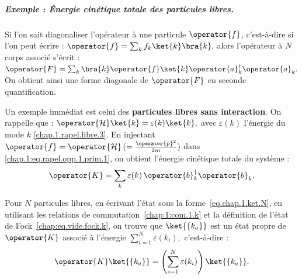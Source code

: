 \begin{mdframed}[
	linewidth=0.5pt, 
	backgroundcolor=gray!5, 
	roundcorner=50pt,	
	innerleftmargin=5pt,
    innerrightmargin=5pt,
    innertopmargin=-10pt,
    innerbottommargin=2pt,
    leftmargin=2pt,
    rightmargin=2pt
	]
\subparagraph{Exemple : Énergie cinétique totale des particules libres.}

Si l’on sait diagonaliser l’opérateur à une particule \( \operator{f} \), c’est-à-dire si l’on peut écrire :
\(
	\operator{f} = \sum_k f_k \ket{k} \bra{k},
\)
alors l’opérateur à $N$ corps associé s’écrit :
\(
	\operator{F} = \sum_k \bra{k} \operator{f} \ket{k} \operator{a}^\dagger_k \operator{a}_k^{}.
\)
On obtient ainsi une forme diagonale de \( \operator{F} \) en seconde quantification.

Un exemple immédiat est celui des \textbf{particules libres sans interaction}. On rappelle que :
\(
	\operator{\mathcal{H}} \ket{k} = \varepsilon(k) \ket{k},
\)
avec $\varepsilon(k)$ l’énergie du mode $k$ \eqref{chap.1.rapel.libre.3}.
En injectant $\operator{f} = \operator{\mathcal{H}} \,( = \frac{\operator{p}^2}{2m})$ dans \eqref{chap.1:eq.rapel.opp.1.prim.1}, on obtient l’énergie cinétique totale du système :
\begin{equation}
	\operator{K} = \sum_{k} \varepsilon(k) \, \operator{b}^\dagger_k \operator{b}_k^{}.\label{eq.chap.1.cinietique.1}
\end{equation}

Pour $N$ particules libres, en écrivant l’état sous la forme~\eqref{eq.chap.1.ket.N}, en utilisant les relations de commutation~\eqref{chap:1:com.1.k} et la définition de l’état de Fock~\eqref{chap:eq.vide.fock.k}, on trouve que $\ket{\{k_a\}}$ est un état propre de $\operator{K}$ associé à l’énergie
\(
	\sum_{i = 1}^N \varepsilon(k_i),
\)
c’est-à-dire :
\begin{eqnarray}
	\operator{K} \ket{\{k_a\}} = \left( \sum_{i = 1}^N \varepsilon(k_i) \right) \ket{\{k_a\}}.\label{eq.chap.1.cinietique.2}
\end{eqnarray}


\end{mdframed}

